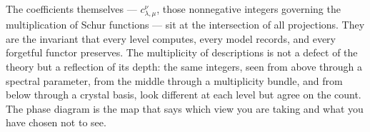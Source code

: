 The coefficients themselves --- $c^\nu_{\lambda,\mu}$, those
nonnegative integers governing the multiplication of Schur functions
--- sit at the intersection of all projections.  They are the invariant
that every level computes, every model records, and every forgetful
functor preserves.  The multiplicity of descriptions is not a defect
of the theory but a reflection of its depth: the same integers, seen
from above through a spectral parameter, from the middle through a
multiplicity bundle, and from below through a crystal basis, look
different at each level but agree on the count.  The phase diagram
is the map that says which view you are taking and what you have
chosen not to see.
